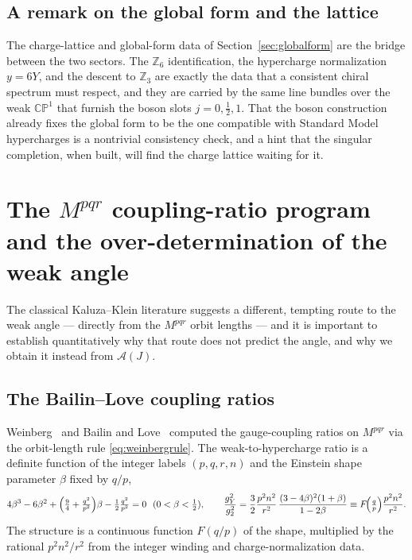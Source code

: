 \documentclass[11pt]{article}
\theoremstyle{plain}
\theoremstyle{definition}
\newcommand{\cA}{\mathcal{A}}
\newcommand{\half}{\tfrac12}
\newcommand{\Z}{\mathbb{Z}}
\begin{document}
\subsection{A remark on the global form and the lattice}

The charge-lattice and global-form data of Section~\ref{sec:globalform} are
the bridge between the two sectors. The $\Z_6$ identification, the
hypercharge normalization $y=6Y$, and the descent to $\Z_3$ are exactly the
data that a consistent chiral spectrum must respect, and they are carried by
the same line bundles over the weak $\mathbb{CP}^1$ that furnish the boson
slots $j=0,\half,1$. That the boson construction already fixes the global form
to be the one compatible with Standard Model hypercharges is a nontrivial
consistency check, and a hint that the singular completion, when built, will
find the charge lattice waiting for it.

\section{The $M^{pqr}$ coupling-ratio program and the over-determination of the weak angle}
\label{sec:control}

The classical Kaluza--Klein literature suggests a different, tempting route
to the weak angle --- directly from the $M^{pqr}$ orbit lengths --- and it is
important to establish quantitatively why that route does not predict the
angle, and why we obtain it instead from $\cA(J)$.

\subsection{The Bailin--Love coupling ratios}

Weinberg~\cite{Weinberg1983} and Bailin and Love~\cite{BailinLove1984,BailinLove1987}
computed the gauge-coupling ratios on $M^{pqr}$ via the orbit-length rule
\eqref{eq:weinbergrule}. The weak-to-hypercharge ratio is a definite
function of the integer labels $(p,q,r,n)$ and the Einstein shape parameter
$\beta$ fixed by $q/p$,
\begin{equation}
4\beta^3-6\beta^2+\Bigl(\tfrac94+\tfrac{q^2}{p^2}\Bigr)\beta
-\tfrac12\tfrac{q^2}{p^2}=0\ \ (0<\beta<\tfrac12),
\qquad
\frac{g_Y^2}{g_2^2}=\frac32\frac{p^2n^2}{r^2}\,
\frac{(3-4\beta)^2(1+\beta)}{1-2\beta}
\equiv F\!\Bigl(\tfrac qp\Bigr)\frac{p^2n^2}{r^2}.
\label{eq:bailinlove}
\end{equation}
The structure is a continuous function $F(q/p)$ of the shape, multiplied by
the rational $p^2n^2/r^2$ from the integer winding and charge-normalization
data.
\end{document}
